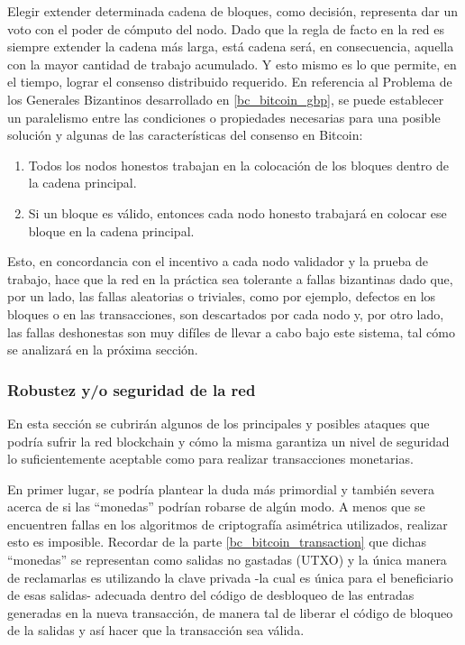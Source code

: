 Elegir extender determinada cadena de bloques, como decisión, representa dar un voto con el poder de cómputo del nodo. Dado que la regla de facto en la red es siempre extender la cadena más larga, está cadena será, en consecuencia, aquella con la mayor cantidad de trabajo acumulado. Y esto mismo es lo que permite, en el tiempo, lograr el consenso distribuido requerido. En referencia al Problema de los Generales Bizantinos desarrollado en \ref{bc_bitcoin_gbp}, se puede establecer un paralelismo entre las condiciones o propiedades necesarias para una posible solución y algunas de las características del consenso en Bitcoin:

\begin{enumerate}
  \item Todos los nodos honestos trabajan en la colocación de los bloques dentro de la cadena principal.
  \item Si un bloque es válido, entonces cada nodo honesto trabajará en colocar ese bloque en la cadena principal.
\end{enumerate}

Esto, en concordancia con el incentivo a cada nodo validador y la prueba de trabajo, hace que la red en la práctica sea tolerante a fallas bizantinas dado que, por un lado, las fallas aleatorias o triviales, como por ejemplo, defectos en los bloques o en las transacciones, son descartados por cada nodo y, por otro lado, las fallas deshonestas son muy difíles de llevar a cabo bajo este sistema, tal cómo se analizará en la próxima sección.

\subsubsection{Robustez y/o seguridad de la red}
\label{bc_bitcoin_security}

En esta sección se cubrirán algunos de los principales y posibles ataques que podría sufrir la red blockchain y cómo la misma garantiza un nivel de seguridad lo suficientemente aceptable como para realizar transacciones monetarias.

En primer lugar, se podría plantear la duda más primordial y también severa acerca de si las ``monedas'' podrían robarse de algún modo. A menos que se encuentren fallas en los algoritmos de criptografía asimétrica utilizados, realizar esto es imposible. Recordar de la parte \ref{bc_bitcoin_transaction} que dichas ``monedas'' se representan como salidas no gastadas (UTXO) y la única manera de reclamarlas es utilizando la clave privada -la cual es única para el beneficiario de esas salidas- adecuada dentro del código de desbloqueo de las entradas generadas en la nueva transacción, de manera tal de liberar el código de bloqueo de la salidas y así hacer que la transacción sea válida.

